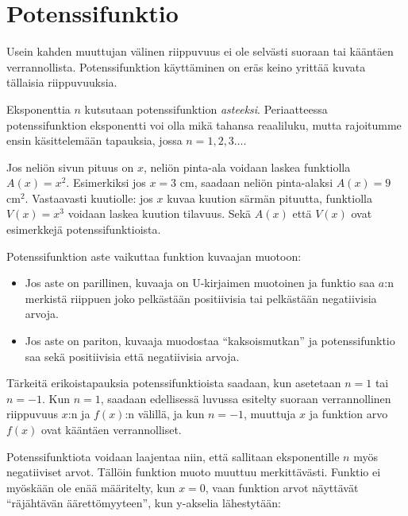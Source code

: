 \chapter{Potenssifunktio}

Usein kahden muuttujan välinen riippuvuus ei ole selvästi suoraan
tai kääntäen verrannollista. Potenssifunktion käyttäminen on eräs
keino yrittää kuvata tällaisia riippuvuuksia.


Eksponenttia $n$ kutsutaan potenssifunktion \emph{asteeksi}. Periaatteessa
potenssifunktion eksponentti voi olla mikä tahansa reaaliluku, mutta
rajoitumme ensin käsittelemään tapauksia, jossa $n = 1, 2, 3\ldots $.

\begin{esimerkki}
Jos neliön sivun pituus on $x$, neliön pinta-ala voidaan laskea
funktiolla $A(x)=x^2$.
Esimerkiksi jos $x = 3$ cm, saadaan neliön pinta-alaksi $A(x) = 9$ cm$^2$.
Vastaavasti kuutiolle: jos $x$ kuvaa kuution särmän pituutta, funktiolla
$V(x)=x^3$ voidaan laskea kuution tilavuus. Sekä $A(x)$ että $V(x)$ ovat
esimerkkejä potenssifunktioista.
\end{esimerkki}

Potenssifunktion aste vaikuttaa funktion kuvaajan muotoon:
\begin{itemize}
  \item
Jos aste on parillinen, kuvaaja on U-kirjaimen muotoinen ja funktio
saa $a$:n merkistä riippuen joko pelkästään positiivisia tai pelkästään
negatiivisia arvoja.
  \item
Jos aste on pariton, kuvaaja muodostaa ``kaksoismutkan'' ja potenssifunktio
saa sekä positiivisia että negatiivisia arvoja.
\end{itemize}


Tärkeitä erikoistapauksia potenssifunktioista saadaan, kun asetetaan $n = 1$ tai
$n = -1$. Kun $n = 1$, saadaan edellisessä luvussa esitelty suoraan verrannollinen
riippuvuus $x$:n ja $f(x)$:n välillä, ja kun $n = -1$, muuttuja $x$ ja
funktion arvo $f(x)$ ovat kääntäen verrannolliset.

Potenssifunktiota voidaan laajentaa niin, että sallitaan eksponentille $n$
myös negatiiviset arvot.
Tällöin funktion muoto muuttuu merkittävästi. Funktio ei myöskään ole
enää määritelty, kun $x = 0$, vaan funktion arvot näyttävät
``räjähtävän äärettömyyteen'', kun y-akselia lähestytään:




